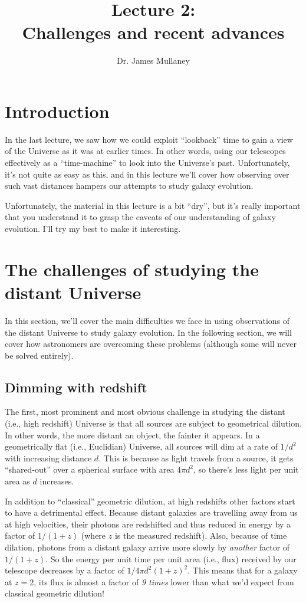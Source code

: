 \documentclass[11pt]{article}
\begin{document}
 
\title{Lecture 2:\\Challenges and recent advances}
\author{Dr. James Mullaney}
\maketitle

\section{Introduction}
In the last lecture, we saw how we could exploit ``lookback'' time to
gain a view of the Universe as it was at earlier times. In other
words, using our telescopes effectively as a ``time-machine'' to look
into the Universe's past. Unfortunately, it's not quite as easy as
this, and in this lecture we'll cover how observing over such vast
distances hampers our attempts to study galaxy evolution.

\vspace{3mm}
\noindent
Unfortunately, the material in this lecture is a bit ``dry'', but it's
really important that you understand it to grasp the caveats of our
understanding of galaxy evolution. I'll try my best to make it
interesting.

\section{The challenges of studying the distant Universe}
In this section, we'll cover the main difficulties we face in using
observations of the distant Universe to study galaxy evolution. In the
following section, we will cover how astronomers are overcoming these
problems (although some will never be solved entirely).

\subsection{Dimming with redshift}
The first, most prominent and most obvious challenge in studying the
distant (i.e., high redshift) Universe is that all sources are subject
to geometrical dilution. In other words, the more distant an object,
the fainter it appears. In a geometrically flat (i.e., Euclidian) Universe,
all sources will dim at a rate of $1/d^2$ with increasing distance
$d$. This is because as light travels from a source, it gets
``shared-out'' over a spherical surface with area $4\pi d^2$, so
there's less light per unit area as $d$ increases.

In addition to ``classical'' geometric dilution, at high redshifts
other factors start to have a detrimental effect. Because distant
galaxies are travelling away from us at high velocities, their photons
are redshifted and thus reduced in energy by a factor of $1/(1+z)$
(where $z$ is the measured redshift). Also, because of time dilation,
photons from a distant galaxy arrive more slowly by {\it another}
factor of $1/(1+z)$. So the energy per unit time per unit area (i.e.,
flux) received by our telescope decreases by a factor of
$1/4\pi d^2(1+z)^2$. This means that for a galaxy at $z=2$, its flux
is almost a factor of {\it 9 times} lower than what we'd expect from
classical geometric dilution!
\end{document}
